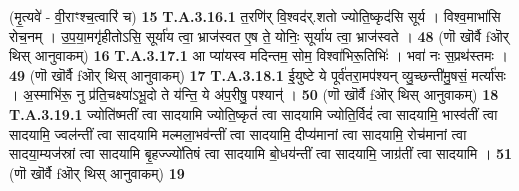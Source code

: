 \documentclass[17pt]{extarticle}
\begin{document}
                  \newline
                                                        (मृ॒त्यवे॑ - वी॒राꣳश्च॒त्वारि॑ च) \textbf{15} \newline \newline
                                \textbf{ T.A.3.16.1} \newline
                  त॒रणि॑र् वि॒श्वद॑र्.शतो ज्योति॒ष्कृद॑सि सूर्य । विश्व॒माभा॑सि रोच॒नम् ।  उ॒प॒या॒मगृ॑हीतोऽसि॒ सूर्या॑य त्वा॒ भ्राज॑स्वत ए॒ष ते॒ योनिः॒ सूर्या॑य त्वा॒ भ्राज॑स्वते । \textbf{ 48} \newline
                  \newline
                                                        (णॊ खॊर्वै fऒर् थिस् आनुवाकम्) \textbf{16} \newline \newline
                                \textbf{ T.A.3.17.1} \newline
                  आ प्या॑यस्व मदिन्तम॒ सोम॒ विश्वा॑भिरू॒तिभिः॑ ।  भवा॑ नः स॒प्रथ॑स्तमः । \textbf{ 49} \newline
                  \newline
                                                        (णॊ खॊर्वै fऒर् थिस् आनुवाकम्) \textbf{17} \newline \newline
                                \textbf{ T.A.3.18.1} \newline
                  ई॒युष्टे ये पूर्व॑तरा॒मप॑श्यन् व्यु॒च्छन्ती॑मु॒षसं॒ मर्त्या॑सः ।  अ॒स्माभि॑रू॒ नु प्र॑ति॒चक्ष्या॑ऽभू॒दो ते य॑न्ति॒ ये अ॑प॒रीषु॒ पश्यान्॑ । \textbf{ 50} \newline
                  \newline
                                                        (णॊ खॊर्वै fऒर् थिस् आनुवाकम्) \textbf{18} \newline \newline
                                \textbf{ T.A.3.19.1} \newline
                  ज्योति॑ष्मतीं त्वा सादयामि ज्योति॒ष्कृतं॑ त्वा सादयामि ज्योति॒र्विदं॑ त्वा सादयामि॒ भास्व॑तीं त्वा सादयामि॒ ज्वल॑न्तीं त्वा सादयामि मल्मला॒भव॑न्तीं त्वा सादयामि॒ दीप्य॑मानां त्वा सादयामि॒ रोच॑मानां  त्वा सादया॒म्यज॑स्रां त्वा सादयामि बृ॒हज्ज्यो॑तिषं त्वा सादयामि बो॒धय॑न्तीं त्वा सादयामि॒ जाग्र॑तीं त्वा सादयामि । \textbf{ 51} \newline
                  \newline
                                                        (णॊ खॊर्वै fऒर् थिस् आनुवाकम्) \textbf{19} \newline \newline
\end{document}
